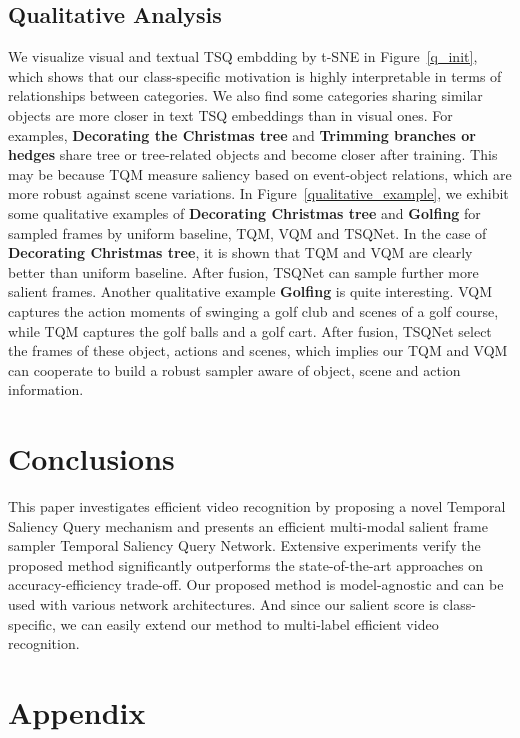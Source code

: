 \documentclass[runningheads]{llncs}
\newcommand{\figref}[1]{Figure~\ref{#1}}
\begin{document}
\subsection{Qualitative Analysis}\label{exp:qualitative}
We visualize visual and textual TSQ embdding by t-SNE in \figref{q_init}, which shows that our class-specific motivation is highly interpretable in terms of relationships between categories.
We also find some categories sharing similar objects are more closer in text TSQ embeddings than in visual ones. For examples, \textbf{Decorating the Christmas tree} and \textbf{Trimming branches or hedges} share tree or tree-related objects and become closer after training. This may be because TQM measure saliency based on event-object relations, which are more robust against scene variations. 
In \figref{qualitative_example}, we exhibit some qualitative examples of \textbf{Decorating Christmas tree} and \textbf{Golfing} for sampled frames by uniform baseline, TQM, VQM and TSQNet. 
In the case of \textbf{Decorating Christmas tree}, it is shown that TQM and VQM are clearly better than uniform baseline. After fusion, TSQNet can sample further more salient frames.
Another qualitative example \textbf{Golfing} is quite interesting.
VQM captures the action moments of swinging a golf club and scenes of a golf course, while TQM captures the golf balls and a golf cart. 
After fusion, TSQNet select the frames of these object, actions and scenes,
which implies our TQM and VQM can cooperate to build a robust sampler aware of object, scene and action information.



\section{Conclusions}
This paper investigates efficient video recognition by proposing a novel Temporal Saliency Query mechanism and presents an efficient multi-modal salient frame sampler Temporal Saliency Query Network.
Extensive experiments verify the proposed method significantly outperforms the state-of-the-art approaches on accuracy-efficiency trade-off.
Our proposed method is model-agnostic and can be used with various network architectures. And since our salient score is class-specific, we can easily extend our method to multi-label efficient video recognition.

\appendix
\section*{Appendix} \label{appendix}
\setcounter{table}{0}
\renewcommand{\thetable}{A.\arabic{table}}
\renewcommand{\thefigure}{A.\arabic{figure}}
\end{document}

